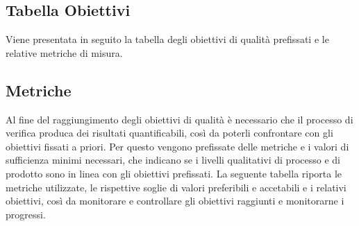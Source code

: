 \subsection{Tabella Obiettivi}
Viene presentata in seguito la tabella degli obiettivi di qualità prefissati e le relative metriche di misura.

\subsection{Metriche}
Al fine del raggiungimento degli obiettivi di qualità è necessario che il processo di verifica produca dei risultati quantificabili, così da poterli confrontare con gli obiettivi fissati a priori. Per questo vengono prefissate delle metriche e i valori di sufficienza minimi necessari, che indicano se i livelli qualitativi di processo e di prodotto sono in linea con gli obiettivi prefissati. La seguente tabella riporta le metriche utilizzate, le rispettive soglie di valori preferibili e accetabili e i relativi obiettivi, così da monitorare e controllare gli obiettivi raggiunti e monitorarne i progressi.

